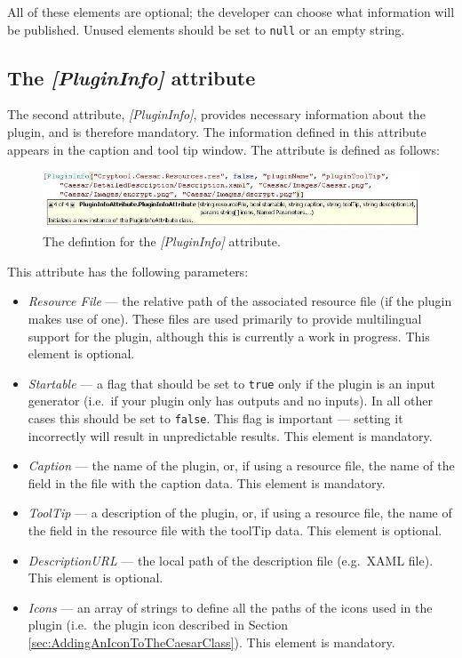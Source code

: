 All of these elements are optional; the developer can choose what information will be published. Unused elements should be set to \texttt{null} or an empty string.

\subsection{The \protect\textit{[PluginInfo]} attribute}
\label{sec:ThePluginInfoAttribute}

The second attribute, \textit{[PluginInfo]}, provides necessary information about the plugin, and is therefore mandatory. The information defined in this attribute appears in the caption and tool tip window. The attribute is defined as follows:

\begin{figure}[h]
	\centering
		\includegraphics[width=1.00\textwidth]{figures/attribute_plugininfo.jpg}
	\caption{The defintion for the \textit{[PluginInfo]} attribute.}
	\label{fig:attribute_plugininfo}
\end{figure}

\noindent This attribute has the following parameters:

\begin{itemize}
	\item \textit{Resource File} --- the relative path of the associated resource file (if the plugin makes use of one). These files are used primarily to provide multilingual support for the plugin, although this is currently a work in progress. This element is optional.
	\item \textit{Startable} --- a flag that should be set to \texttt{true} only if the plugin is an input generator (i.e.\ if your plugin only has outputs and no inputs). In all other cases this should be set to \texttt{false}. This flag is important --- setting it incorrectly will result in unpredictable results. This element is mandatory.
	\item \textit{Caption} --- the name of the plugin, or, if using a resource file, the name of the field in the file with the caption data. This element is mandatory.
	\item \textit{ToolTip} --- a description of the plugin, or, if using a resource file, the name of the field in the resource file with the toolTip data. This element is optional.
	\item \textit{DescriptionURL} --- the local path of the description file (e.g.\ XAML file). This element is optional.
	\item \textit{Icons} --- an array of strings to define all the paths of the icons used in the plugin (i.e.\ the plugin icon described in Section \ref{sec:AddingAnIconToTheCaesarClass}). This element is mandatory.
\end{itemize}

